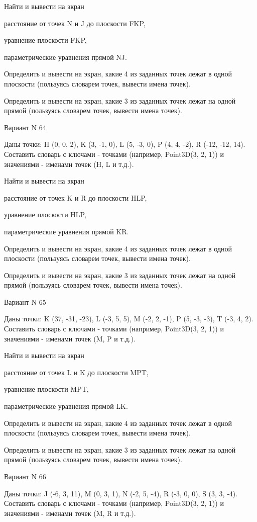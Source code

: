 \documentclass[11pt]{report}
\begin{document}
 
Найти и вывести на экран


расстояние от точек N и J до плоскости FKP,

 
уравнение плоскости FKP,

 
параметрические уравнения прямой NJ.


Определить и вывести на экран, какие 4 из заданных точек лежат в одной плоскости (пользуясь словарем точек, вывести имена точек).


Определить и вывести на экран, какие 3 из заданных точек лежат на одной прямой (пользуясь словарем точек, вывести имена точек).

Вариант N 64

Даны точки: H (0, 0, 2), K (3, -1, 0), L (5, -3, 0), P (4, 4, -2), R (-12, -12, 14).
Составить словарь с ключами - точками (например, Point3D(3, 2, 1)) и значениями - именами точек (H, L и т.д.).

 
Найти и вывести на экран


расстояние от точек K и R до плоскости HLP,

 
уравнение плоскости HLP,

 
параметрические уравнения прямой KR.


Определить и вывести на экран, какие 4 из заданных точек лежат в одной плоскости (пользуясь словарем точек, вывести имена точек).


Определить и вывести на экран, какие 3 из заданных точек лежат на одной прямой (пользуясь словарем точек, вывести имена точек).

Вариант N 65

Даны точки: K (37, -31, -23), L (-3, 5, 5), M (-2, 2, -1), P (5, -3, -3), T (-3, 4, 2).
Составить словарь с ключами - точками (например, Point3D(3, 2, 1)) и значениями - именами точек (M, P и т.д.).

 
Найти и вывести на экран


расстояние от точек L и K до плоскости MPT,

 
уравнение плоскости MPT,

 
параметрические уравнения прямой LK.


Определить и вывести на экран, какие 4 из заданных точек лежат в одной плоскости (пользуясь словарем точек, вывести имена точек).


Определить и вывести на экран, какие 3 из заданных точек лежат на одной прямой (пользуясь словарем точек, вывести имена точек).

Вариант N 66

Даны точки: J (-6, 3, 11), M (0, 3, 1), N (-2, 5, -4), R (-3, 0, 0), S (3, 3, -4).
Составить словарь с ключами - точками (например, Point3D(3, 2, 1)) и значениями - именами точек (M, R и т.д.).
\end{document}
